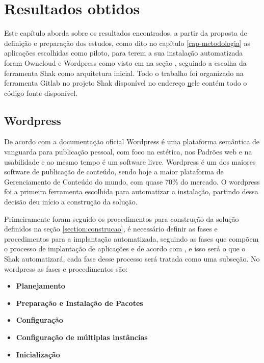 \chapter{Resultados obtidos}
\label{cap-resultados}

Este capítulo aborda sobre os resultados encontrados, a partir da proposta de
definição e preparação dos estudos, como dito no capítulo \ref{cap-metodologia}
as aplicações escolhidas como piloto, para terem a sua instalação automatizada foram Owncloud e
Wordpress como visto em na seção \label{subsection:validacao}
, seguindo a escolha da ferramenta Shak como arquitetura inicial. Todo
o trabalho foi organizado na ferramenta Gitlab
no projeto Shak disponível no endereço \href{https://gitlab.com/Shak/Shak/} nele
contém todo o código fonte disponível.

\section{Wordpress}
\label{sub:wordpress}

De acordo com a documentação oficial \cite{wordpress} Wordpress é uma plataforma
semântica de vanguarda para publicação pessoal, com foco na estética, nos
Padrões web e na usabilidade e ao mesmo tempo é um software livre. Wordpress é
um dos maiores software de publicação de conteúdo, sendo hoje a maior
plataforma de Gerenciamento de Conteúdo do mundo, com quase 70\% do mercado. O
wordpress foi a primeira ferramenta escolhida para automatizar a instalação, partindo
dessa decisão deu início a construção da solução.

Primeiramente foram seguido os procedimentos para construção da solução definidos na seção \ref{section:construcao}, é
necessário definir as fases e procedimentos para a implantação automatizada,
seguindo as fases que compõem o processo de implantação de aplicações e de acordo
com \cite{omg2006}, e isso será o que o Shak automatizará, cada fase desse processo
 será tratada como uma subseção. No wordpress as fases e procedimentos são:

\begin{itemize}
  \item  \textbf{Planejamento}
  \item  \textbf{Preparação e Instalação de Pacotes}
  \item  \textbf{Configuração}
  \item  \textbf{Configuração de múltiplas instâncias}
  \item  \textbf{Inicialização}
\end{itemize}


